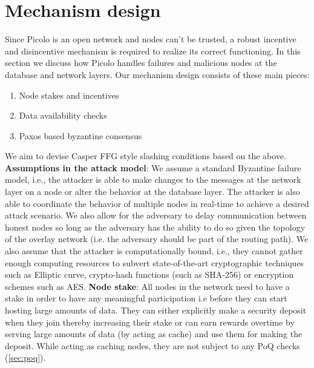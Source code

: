 \section{Mechanism design}
Since Picolo is an open network and nodes can't be trusted, a robust incentive and disincentive mechanism is required to realize its correct functioning. In this section we discuss how Picolo handles failures and malicious nodes at the database and network layers. Our mechanism design consists of these main pieces:
\begin{enumerate}
	\item Node stakes and incentives
	\item Data availability checks
	\item Paxos based byzantine consensus \cite{byzantine_paxos}
\end{enumerate}
We aim to devise Casper FFG \cite{casper_ffg} style slashing conditions based on the above.
\newline\newline
\textbf{Assumptions in the attack model}: We assume a standard Byzantine failure model, i.e., the attacker is able to make changes to the messages at the network layer on a node or alter the behavior at the database layer. The attacker is also able to coordinate the behavior of multiple nodes in real-time to achieve a desired attack scenario. We also allow for the adversary to delay communication between honest nodes so long as the adversary has the ability to do so given the topology of the overlay network (i.e. the adversary should be part of the routing path). We also assume that the attacker is computationally bound, i.e., they cannot gather enough computing resources to subvert state-of-the-art cryptographic techniques such as Elliptic curve, crypto-hash functions (such as SHA-256) or encryption schemes such as AES.
\newline\newline
\textbf{Node stake}: All nodes in the network need to have a stake in order to have any meaningful participation i.e before they can start hosting large amounts of data. They can either explicitly make a security deposit when they join thereby increasing their stake or can earn rewards overtime by serving large amounts of data (by acting as cache) and use them for making the deposit. While acting as caching nodes, they are not subject to any PoQ checks (\cref{sec:poq}). 
\newline\newline
